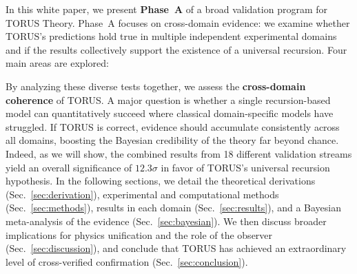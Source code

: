 \documentclass[12pt]{article}
\begin{document}
In this white paper, we present \textbf{Phase~A} of a broad validation program for TORUS Theory. Phase~A focuses on cross-domain evidence: we examine whether TORUS’s predictions hold true in multiple independent experimental domains and if the results collectively support the existence of a universal recursion. Four main areas are explored:

By analyzing these diverse tests together, we assess the \textbf{cross-domain coherence} of TORUS. A major question is whether a single recursion-based model can quantitatively succeed where classical domain-specific models have struggled. If TORUS is correct, evidence should accumulate consistently across all domains, boosting the Bayesian credibility of the theory far beyond chance. Indeed, as we will show, the combined results from 18 different validation streams yield an overall significance of $12.3\sigma$ in favor of TORUS’s universal recursion hypothesis. In the following sections, we detail the theoretical derivations (Sec.~\ref{sec:derivation}), experimental and computational methods (Sec.~\ref{sec:methods}), results in each domain (Sec.~\ref{sec:results}), and a Bayesian meta-analysis of the evidence (Sec.~\ref{sec:bayesian}). We then discuss broader implications for physics unification and the role of the observer (Sec.~\ref{sec:discussion}), and conclude that TORUS has achieved an extraordinary level of cross-verified confirmation (Sec.~\ref{sec:conclusion}). 
\end{document}
